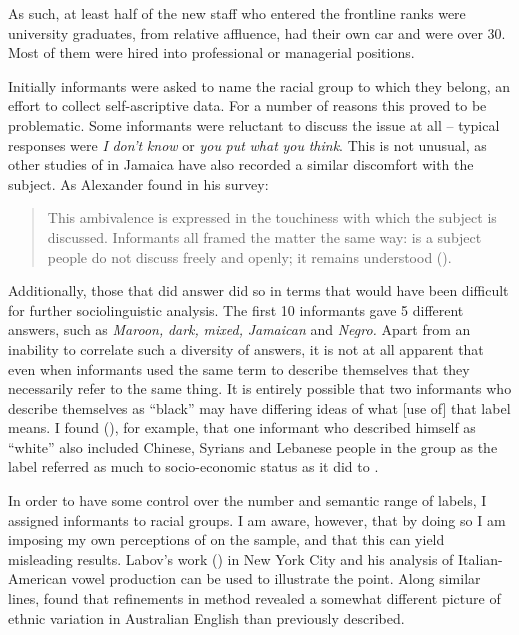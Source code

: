 As such, at least half of the new staff who entered the frontline ranks were university graduates, from relative affluence, had their own car and were over 30.  Most of them were hired into professional or managerial positions.  

Initially informants were asked to name the racial group to which they belong, an effort to collect self-ascriptive data.  For a number of reasons this proved to be problematic.  Some informants were reluctant to discuss the issue at all – typical responses were \textit{I} \textit{don’t} \textit{know} or \textit{you} \textit{put} \textit{what} \textit{you} \textit{think}.  This is not unusual, as other studies of  in Jamaica have also recorded a similar discomfort with the subject.  As Alexander found in his survey:

\begin{quote}
	This ambivalence is expressed in the touchiness with which the subject is discussed.  Informants all framed the matter the same way:  is a subject people do not discuss freely and openly; it remains understood (\citeyear[427]{Alexander1977}).
\end{quote}

Additionally, those that did answer did so in terms that would have been difficult for further sociolinguistic analysis.  The first 10 informants gave 5 different answers, such as \textit{Maroon,} \textit{dark,} \textit{mixed,} \textit{Jamaican} and \textit{Negro.}  Apart from an inability to correlate such a diversity of answers, it is not at all apparent that even when informants used the same term to describe themselves that they necessarily refer to the same thing.  It is entirely possible that two informants who describe themselves as “black” may have differing ideas of what [use of] that label means.  I found (\citeyear{Irvine1988}), for example, that one informant who described himself as “white” also included Chinese, Syrians and Lebanese people in the group as the label referred as much to socio-economic status as it did to .

In order to have some control over the number and semantic range of labels, I assigned informants to racial groups.  I am aware, however, that by doing so I am imposing my own perceptions of  on the sample, and that this can yield misleading results.  Labov’s work (\citeyear[298]{Labov1972}) in New York City and his analysis of Italian-American vowel production can be used to illustrate the point.  Along similar lines, \citet{Horvath1987} found that refinements in method revealed a somewhat different picture of ethnic variation in Australian English than previously described.    

